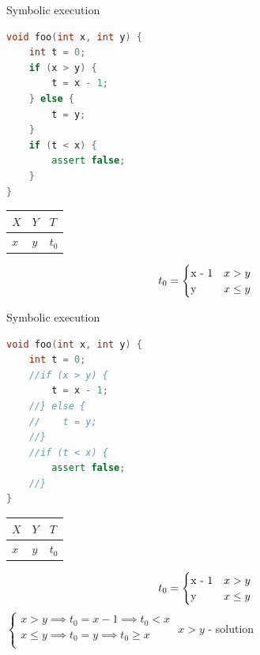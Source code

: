 \documentclass{beamer}
\begin{document}
\begin{frame}[fragile]{Symbolic execution}
\begin{minipage}{0.49\textwidth}
\begin{lstlisting}[language=C++]
void foo(int x, int y) {
    int t = 0;
    if (x > y) {
        t = x - 1;
    } else {
        t = y;
    }
    if (t < x) {
        assert false;
    }
}
\end{lstlisting}
\end{minipage}
\hfill
\begin{minipage}{0.49\textwidth}
\begin{center}
\begin{tabular}{ | l | l | l | }
\hline
$X$ & $Y$ & $T$ \\
\hline
$x$ & $y$ & $t_0$ \\
\hline
\end{tabular}
\begin{equation*}
t_0 =
    \begin{cases}
    $x - 1$ &\text{$x > y$}\\
    $y$ &\text{$x \le y$}
    \end{cases}
\end{equation*}
\end{center}
\end{minipage}
\end{frame}

\begin{frame}[fragile]{Symbolic execution}
\begin{minipage}{0.49\textwidth}
\begin{lstlisting}[language=C++]
void foo(int x, int y) {
    int t = 0;
    //if (x > y) {
        t = x - 1;
    //} else {
    //    t = y;
    //}
    //if (t < x) {
        assert false;
    //}
}
\end{lstlisting}
\end{minipage}
\hfill
\begin{minipage}{0.49\textwidth}
\begin{center}
\begin{tabular}{ | l | l | l | }
\hline
$X$ & $Y$ & $T$ \\
\hline
$x$ & $y$ & $t_0$ \\
\hline
\end{tabular}
\begin{equation*}
t_0 =
    \begin{cases}
    $x - 1$ &\text{$x > y$}\\
    $y$ &\text{$x \le y$}
    \end{cases}
\end{equation*}
$\left\{
\begin{array}{l}
x > y \implies t_0 = x - 1 \implies t_0 < x \\
x \le y \implies t_0 = y \implies t_0 \ge x \\
\end{array}
\right.$
$x > y$ - solution
\end{center}
\end{minipage}
\end{frame}
\end{document}

